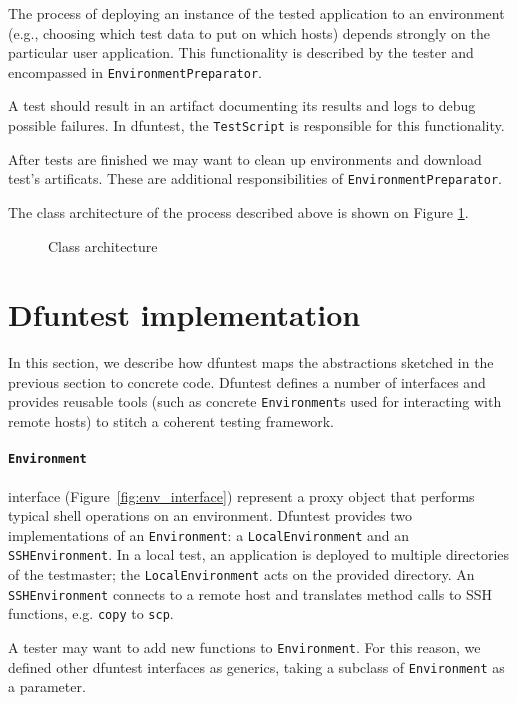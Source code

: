 The process of deploying an instance of the tested application to an
environment (e.g., choosing which test data to put on which hosts)
depends strongly on the particular user application. This functionality is
described by the tester and encompassed in \texttt{EnvironmentPreparator}.

A test should result in an artifact documenting its results and logs to debug
possible failures. In dfuntest, the \texttt{TestScript} is responsible for this
functionality.

After tests are finished we may want to clean up environments and download test's artificats.
These are additional responsibilities of \texttt{EnvironmentPreparator}.

The class architecture of the process described above is shown on Figure
\ref{fig:4_class_architecture}.

\begin{figure}[tbp]
  \centering
  \def\svgwidth{\columnwidth}
  \scriptsize {
  
}
\caption{Class architecture}
\label{fig:4_class_architecture}
\end{figure}

\section{Dfuntest implementation}\label{sec:dfunt-impl}

In this section, we describe how dfuntest maps the abstractions sketched in the previous section to concrete code. Dfuntest defines a number of interfaces and provides reusable tools (such as concrete \texttt{Environment}s used for interacting with remote hosts) to stitch a coherent testing framework.

\paragraph{\texttt{Environment}} interface (Figure~\ref{fig:env_interface}) represent a proxy
object that performs typical shell operations on an environment.
Dfuntest provides two implementations of an \texttt{Environment}:
a \texttt{LocalEnvironment} and an \texttt{SSHEnvironment}.
In a local test, an application is deployed to multiple directories of the testmaster; the \texttt{LocalEnvironment} acts on the provided directory.
An \texttt{SSHEnvironment} connects to a remote host and translates method calls to SSH functions, e.g. \texttt{copy} to \texttt{scp}.

A tester may want to add new functions to \texttt{Environment}. For this reason, we defined other dfuntest interfaces as generics, taking a subclass of \texttt{Environment} as a parameter. 

